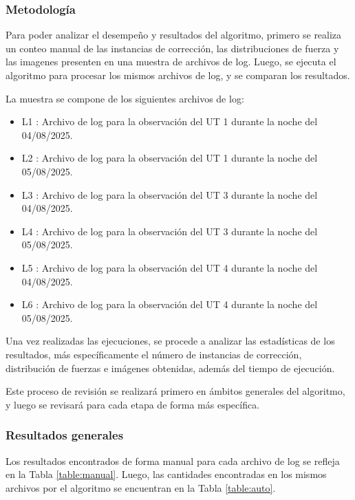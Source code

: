 \subsubsection{Metodología}

Para poder analizar el desempeño y resultados del algoritmo, primero se realiza un conteo manual de las instancias de corrección, las distribuciones de fuerza y las imagenes presenten en una muestra de archivos de log. Luego, se ejecuta el algoritmo para procesar los mismos archivos de log, y se comparan los resultados. 

La muestra se compone de los siguientes archivos de log:

\begin{itemize}
    \item L1 : Archivo de log para la observación del UT 1 durante la noche del 04/08/2025.

    \item L2 : Archivo de log para la observación del UT 1 durante la noche del 05/08/2025.

    \item L3 : Archivo de log para la observación del UT 3 durante la noche del 04/08/2025.

    \item L4 : Archivo de log para la observación del UT 3 durante la noche del 05/08/2025.

    \item L5 : Archivo de log para la observación del UT 4 durante la noche del 04/08/2025.

    \item L6 : Archivo de log para la observación del UT 4 durante la noche del 05/08/2025.    
\end{itemize}

Una vez realizadas las ejecuciones, se procede a analizar las estadísticas de los resultados, más específicamente el número de instancias de corrección, distribución de fuerzas e imágenes obtenidas, además del tiempo de ejecución.

Este proceso de revisión se realizará primero en ámbitos generales del algoritmo, y luego se revisará para cada etapa de forma más específica.

\subsubsection{Resultados generales}

Los resultados encontrados de forma manual para cada archivo de log se refleja en la Tabla \ref{table:manual}. Luego, las cantidades encontradas en los mismos archivos por el algoritmo se encuentran en la Tabla \ref{table:auto}.


